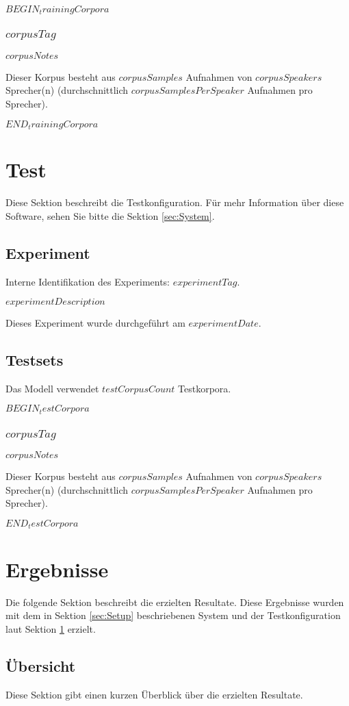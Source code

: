 \documentclass[a4paper,10pt,bibtotoc]{scrartcl}
\begin{document}
\begin{multicols}{2}
$BEGIN_trainingCorpora$
\subsubsection{$corpusTag$}

$corpusNotes$

Dieser Korpus besteht aus $corpusSamples$ Aufnahmen von $corpusSpeakers$ Sprecher(n) (durchschnittlich $corpusSamplesPerSpeaker$ Aufnahmen pro Sprecher).

$END_trainingCorpora$

\section{Test}
\label{sec:Test}

Diese Sektion beschreibt die Testkonfiguration. Für mehr Information über diese Software, sehen Sie bitte die Sektion \ref{sec:System}.

\subsection{Experiment}

Interne Identifikation des Experiments: $experimentTag$.

$experimentDescription$

Dieses Experiment wurde durchgeführt am $experimentDate$.

\subsection{Testsets}
\label{sec:Testsets}

Das Modell verwendet $testCorpusCount$ Testkorpora.

$BEGIN_testCorpora$
\subsubsection{$corpusTag$}
\label{sec:$SAVE_corpusTag$}

$corpusNotes$

Dieser Korpus besteht aus $corpusSamples$ Aufnahmen von $corpusSpeakers$ Sprecher(n) (durchschnittlich $corpusSamplesPerSpeaker$ Aufnahmen pro Sprecher).

$END_testCorpora$


\section{Ergebnisse}

Die folgende Sektion beschreibt die erzielten Resultate. Diese Ergebnisse wurden mit dem in Sektion \ref{sec:Setup} beschriebenen System und der Testkonfiguration laut Sektion \ref{sec:Test} erzielt.

\subsection{Übersicht}

Diese Sektion gibt einen kurzen Überblick über die erzielten Resultate.

\end{multicols}
\end{document}
